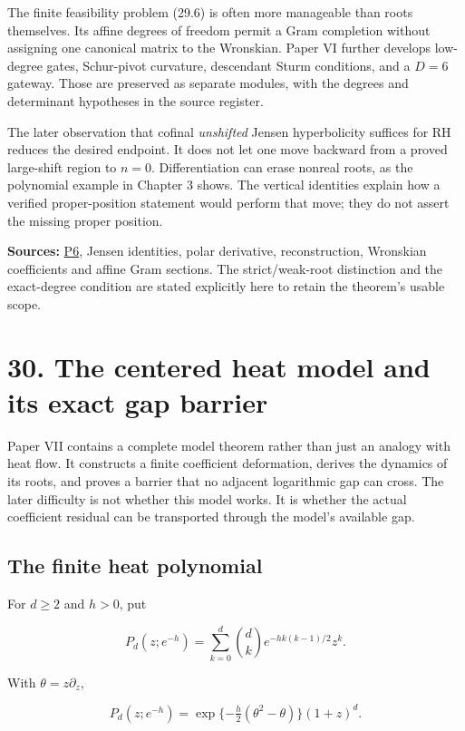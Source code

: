 \documentclass[
  10pt,
  a4paper,
  10pt,
  oneside,
  openany]{book}
\begin{document}
The finite feasibility problem (29.6) is often more manageable than
roots themselves. Its affine degrees of freedom permit a Gram completion
without assigning one canonical matrix to the Wronskian. Paper VI
further develops low-degree gates, Schur-pivot curvature, descendant
Sturm conditions, and a \(D=6\) gateway. Those are preserved as separate
modules, with the degrees and determinant hypotheses in the source
register.

The later observation that cofinal \emph{unshifted} Jensen hyperbolicity
suffices for RH reduces the desired endpoint. It does not let one move
backward from a proved large-shift region to \(n=0\). Differentiation
can erase nonreal roots, as the polynomial example in Chapter 3 shows.
The vertical identities explain how a verified proper-position statement
would perform that move; they do not assert the missing proper position.

\textbf{Sources:} \hyperref[source-p6]{P6}, Jensen identities, polar
derivative, reconstruction, Wronskian coefficients and affine Gram
sections. The strict/weak-root distinction and the exact-degree
condition are stated explicitly here to retain the theorem's usable
scope.

\section{30. The centered heat model and its exact gap
barrier}\label{ch-centered-heat}

Paper VII contains a complete model theorem rather than just an analogy
with heat flow. It constructs a finite coefficient deformation, derives
the dynamics of its roots, and proves a barrier that no adjacent
logarithmic gap can cross. The later difficulty is not whether this
model works. It is whether the actual coefficient residual can be
transported through the model's available gap.

\subsection{The finite heat
polynomial}\label{the-finite-heat-polynomial}

For \(d\ge2\) and \(h>0\), put

\[
 P_d(z;e^{-h})=\sum_{k=0}^d\binom dk
 e^{-hk(k-1)/2}z^k.
 \tag{30.1}\label{eq:30.1}
\]

With \(\theta=z\partial_z\),

\[
 P_d(z;e^{-h})=
 \exp\{-\tfrac h2(\theta^2-\theta)\}(1+z)^d.
\]
\end{document}
